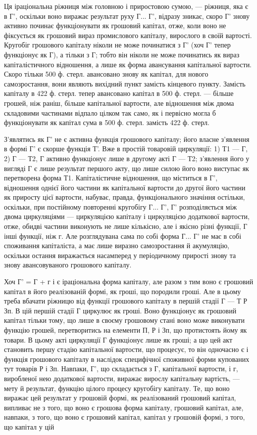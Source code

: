 Ця іраціональна ріжниця між головною і приростовою сумою, — ріжниця,
яка є в Г', оскільки воно виражає результат руху Г... Г', відразу зникає,
скоро Г' знову активно починає функціонувати як грошовий капітал, отже,
коли воно не фіксується як грошовий вираз промислового капіталу, вирослого
в своїй вартості. Кругобіг грошового капіталу ніколи не може
починатися з Г' (хоч Г' тепер функціонує як Г), а тільки з Г; тобто
він ніколи не може починатись як вираз капіталістичного відношення, а
лише як форма авансування капітальної вартости. Скоро тільки 500 ф.
стерл. авансовано знову як капітал, для нового самозростання, вони
являють вихідний пункт замість кінцевого пункту. Замість капіталу в
422 ф. стерл. тепер авансовано капітал в 500 ф. стерл. — більше
грошей, ніж раніш, більше капітальної вартости, але відношення між
двома складовими частинами відпало цілком так само, як і первісно
могла б функціонувати як капітал сума в 500 ф. стерл. замість
422 ф. стерл.

З’являтись як Г' не є активна функція грошового капіталу; його
власне з’явлення в формі Г' є скорше функція Т'. Вже в простій товаровій
циркуляції: 1) Т1 — Г, 2) Г — Т2, Г активно функціонує лише в
другому акті Г — Т2; з’явлення його у вигляді Г є лише результат першого
акту, що лише силою його воно виступає як перетворена форма
Т1. Капіталістичне відношення, що міститься в Г', відношення однієї його
частини як капітальної вартости до другої його частини як приросту
цієї вартости, набуває, правда, функціонального значіння остільки, оскільки,
при постійному повторенні кругобігу Г... Г', Г' розподіляється між двома
циркуляціями — циркуляцією капіталу і циркуляцією додаткової вартости,
отже, обидві частини виконують не лише кількісно, але і якісно
різні функції, Г інші функції, ніж г. Але розглядувана сама по собі форма
Г... Г' не має в собі споживання капіталіста, а має лише виразно
самозростання й акумуляцію, оскільки остання виражається насамперед
у періодичному прирості знову та знову авансовуваного грошового
капіталу.

Хоч Г' = Г + г і є іраціональна форма капіталу, але разом з тим воно
є грошовий капітал в його реалізованій формі, як гроші, що породили
гроші. Але в цьому треба вбачати ріжницю від функції грошового
капіталу в першій стадії Г — Т Р Зп. В цій першій стадії Г циркулює
як гроші. Воно функціонує як грошовий капітал тільки тому, що
лише в своєму грошовому стані воно може виконувати функцію грошей,
перетворитись на елементи П, Р і Зп, що протистоять йому як товари.
В цьому акті циркуляції Г функціонує лише як гроші; а що цей акт
становить першу стадію капітальної вартости, що процесує, то він одночасно
є і функція грошового капіталу в наслідок специфічної споживної
форми купованих тут товарів Р і Зп. Навпаки, Г', що складається з Г, капітальної
вартости, і г, виробленої нею додаткової вартости, виражає вирослу
капітальну вартість, — мету й результат, функцію цілого процесу
кругобігу капіталу. Те, що воно виражає цей результат у грошовій формі,
як реалізований грошовий капітал, випливає не з того, що воно є грошова
форма капіталу, грошовий капітал, але, навпаки, з того, що воно є
грошовий капітал, капітал у грошовій формі, з того, що капітал у цій
\parbreak{}  %
